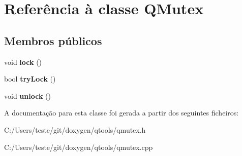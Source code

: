 \hypertarget{class_q_mutex}{\section{Referência à classe Q\-Mutex}
\label{class_q_mutex}
}
\subsection*{Membros públicos}
\begin{DoxyCompactItemize}
\item 
\hypertarget{class_q_mutex_aa81aed607133209dade63a226818224d}{void {\bfseries lock} ()}\label{class_q_mutex_aa81aed607133209dade63a226818224d}

\item 
\hypertarget{class_q_mutex_ac1aa74f9e66d65b9dccf7a2e92921192}{bool {\bfseries try\-Lock} ()}\label{class_q_mutex_ac1aa74f9e66d65b9dccf7a2e92921192}

\item 
\hypertarget{class_q_mutex_a9278be8203e1c42e2619179882ae4403}{void {\bfseries unlock} ()}\label{class_q_mutex_a9278be8203e1c42e2619179882ae4403}

\end{DoxyCompactItemize}


A documentação para esta classe foi gerada a partir dos seguintes ficheiros\-:\begin{DoxyCompactItemize}
\item 
C\-:/\-Users/teste/git/doxygen/qtools/qmutex.\-h\item 
C\-:/\-Users/teste/git/doxygen/qtools/qmutex.\-cpp\end{DoxyCompactItemize}
